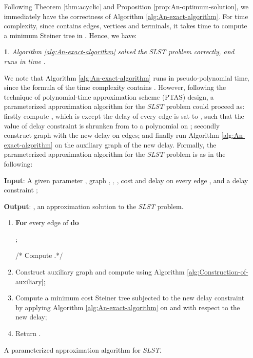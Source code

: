 \documentclass[english,runningheads,a4paper]{llncs}
\newtheorem{thm}{\protect\theoremname}
\providecommand{\theoremname}{Theorem}
\begin{document}
Following Theorem \ref{thm:acyclic} and Proposition \ref{prop:An-optimum-solution},
we immediately have the correctness of Algorithm \ref{alg:An-exact-algorithm}.
For time complexity, since  contains  edges, 
vertices and  terminals, it takes 
time to compute a minimum Steiner tree in . Hence, we have:
\begin{thm}
\label{thm:best-1}Algorithm \ref{alg:An-exact-algorithm} solved
the SLST problem correctly, and runs in time .
\end{thm}
We note that Algorithm \ref{alg:An-exact-algorithm} runs in pseudo-polynomial
time, since the formula of the time complexity contains . However,
following the technique of polynomial-time approximation scheme (PTAS)
design, a parameterized approximation algorithm for the \emph{SLST}
problem could proceed as: firstly compute , which is  except
the delay of every edge  is sat to ,
such that the value of delay constraint is shrunken from  to a
polynomial on ; secondly construct graph  with the new delay
on edges; and finally run Algorithm \ref{alg:An-exact-algorithm}
on the auxiliary graph  of the new delay. Formally, the parameterized
approximation algorithm for the\emph{ SLST }problem is as in the following:

\begin{algorithm}
\textbf{Input}: A given parameter , graph , ,
, cost and delay 
on every edge , and a delay constraint ;

\textbf{Output}: , an approximation solution to the \emph{SLST}
problem.
\begin{enumerate}
\item \textbf{For} every edge of  \textbf{do}


\quad{};


/{*} Compute .{*}/

\item Construct auxiliary graph  and compute  using Algorithm
\ref{alg:Construction-of-auxiliary};
\item Compute a minimum cost Steiner tree  subjected to the new delay
constraint by applying
Algorithm \ref{alg:An-exact-algorithm} on  and  with respect
to the new delay;
\item Return .
\end{enumerate}
\caption{\label{alg:appro-algorithm-1}A parameterized approximation algorithm
for \emph{SLST}.}
\end{algorithm}
\end{document}
